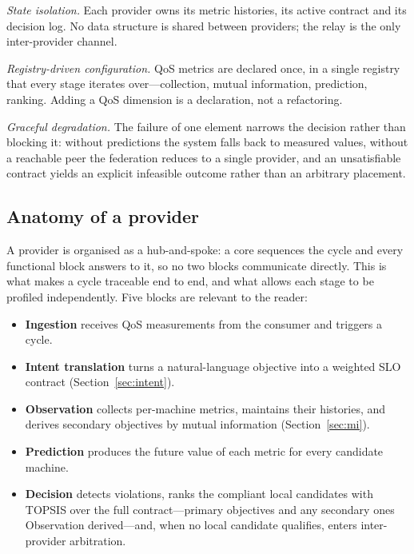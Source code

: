 \documentclass[conference]{IEEEtran}
\begin{document}
\emph{State isolation.} Each provider owns its metric histories, its active
contract and its decision log. No data structure is shared between providers;
the relay is the only inter-provider channel.

\emph{Registry-driven configuration.} QoS metrics are declared once, in a
single registry that every stage iterates over---collection, mutual
information, prediction, ranking. Adding a QoS dimension is a declaration, not
a refactoring.

\emph{Graceful degradation.} The failure of one element narrows the decision
rather than blocking it: without predictions the system falls back to measured
values, without a reachable peer the federation reduces to a single provider,
and an unsatisfiable contract yields an explicit infeasible outcome rather
than an arbitrary placement.

\subsection{Anatomy of a provider}

A provider is organised as a hub-and-spoke: a core sequences the cycle and
every functional block answers to it, so no two blocks communicate directly.
This is what makes a cycle traceable end to end, and what allows each stage to
be profiled independently. Five blocks are relevant to the reader:

\begin{itemize}
    \item \textbf{Ingestion} receives QoS measurements from the consumer and
    triggers a cycle.
    \item \textbf{Intent translation} turns a natural-language objective into
    a weighted SLO contract (Section~\ref{sec:intent}).
    \item \textbf{Observation} collects per-machine metrics, maintains their
    histories, and derives secondary objectives by mutual information
    (Section~\ref{sec:mi}).
    \item \textbf{Prediction} produces the future value of each metric for
    every candidate machine.
    \item \textbf{Decision} detects violations, ranks the compliant local
    candidates with TOPSIS over the full contract---primary objectives and
    any secondary ones Observation derived---and, when no local candidate
    qualifies, enters inter-provider arbitration.
\end{itemize}
\end{document}
